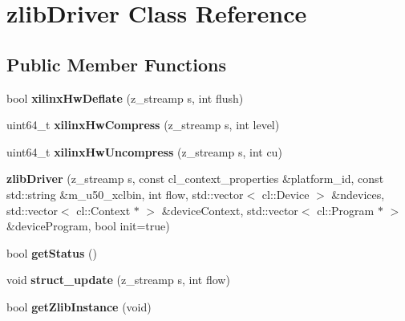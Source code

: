 \hypertarget{classzlibDriver}{\section{zlib\-Driver Class Reference}
\label{classzlibDriver}
}
\subsection*{Public Member Functions}
\begin{DoxyCompactItemize}
\item 
\hypertarget{classzlibDriver_aac5df3ec5fa4a4b9176b5cd1c7fa8b21}{bool {\bfseries xilinx\-Hw\-Deflate} (z\-\_\-streamp s, int flush)}\label{classzlibDriver_aac5df3ec5fa4a4b9176b5cd1c7fa8b21}

\item 
\hypertarget{classzlibDriver_ad258546d6000ab464f4fd006e4d31492}{uint64\-\_\-t {\bfseries xilinx\-Hw\-Compress} (z\-\_\-streamp s, int level)}\label{classzlibDriver_ad258546d6000ab464f4fd006e4d31492}

\item 
\hypertarget{classzlibDriver_a23c281eeb6d90000f2ffc3ff2d91053c}{uint64\-\_\-t {\bfseries xilinx\-Hw\-Uncompress} (z\-\_\-streamp s, int cu)}\label{classzlibDriver_a23c281eeb6d90000f2ffc3ff2d91053c}

\item 
\hypertarget{classzlibDriver_a0a2b440d8023eb944d8d5f788089f126}{{\bfseries zlib\-Driver} (z\-\_\-streamp s, const cl\-\_\-context\-\_\-properties \&platform\-\_\-id, const std\-::string \&m\-\_\-u50\-\_\-xclbin, int flow, std\-::vector$<$ cl\-::\-Device $>$ \&ndevices, std\-::vector$<$ cl\-::\-Context $\ast$ $>$ \&device\-Context, std\-::vector$<$ cl\-::\-Program $\ast$ $>$ \&device\-Program, bool init=true)}\label{classzlibDriver_a0a2b440d8023eb944d8d5f788089f126}

\item 
\hypertarget{classzlibDriver_a5f64f2eee66d23270b084470e7d972d9}{bool {\bfseries get\-Status} ()}\label{classzlibDriver_a5f64f2eee66d23270b084470e7d972d9}

\item 
\hypertarget{classzlibDriver_ae94889732c3e2e128f3fa7ab1578a995}{void {\bfseries struct\-\_\-update} (z\-\_\-streamp s, int flow)}\label{classzlibDriver_ae94889732c3e2e128f3fa7ab1578a995}

\item 
\hypertarget{classzlibDriver_a03573fbdc2208c50695b09d42493d19f}{bool {\bfseries get\-Zlib\-Instance} (void)}\label{classzlibDriver_a03573fbdc2208c50695b09d42493d19f}


\end{DoxyCompactItemize}
